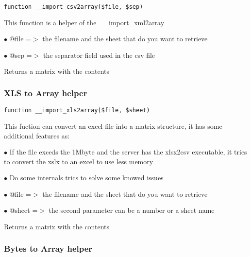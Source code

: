 \documentclass[a4paper]{article}
\begin{document}
\begin{lstlisting}
function __import_csv2array($file, $sep)
\end{lstlisting}

This function is a helper of the \_\_import\_xml2array

\begin{compactitem}
\item[\color{myblue}$\bullet$] @file =$>$ the filename and the sheet that do you want to retrieve
\item[\color{myblue}$\bullet$] @sep  =$>$ the separator field used in the csv file
\end{compactitem}

Returns a matrix with the contents

\hypertarget{toc468}{}
\subsubsection{XLS to Array helper}

\begin{lstlisting}
function __import_xls2array($file, $sheet)
\end{lstlisting}

This fuction can convert an excel file into a matrix structure, it has some additional features as:

\begin{compactitem}
\item[\color{myblue}$\bullet$] If the file exceds the 1Mbyte and the server has the xlsx2csv executable, it tries to convert the xslx
  to an excel to use less memory
\item[\color{myblue}$\bullet$] Do some internals trics to solve some knowed issues
\end{compactitem}

\begin{compactitem}
\item[\color{myblue}$\bullet$] @file  =$>$ the filename and the sheet that do you want to retrieve
\item[\color{myblue}$\bullet$] @sheet =$>$ the second parameter can be a number or a sheet name
\end{compactitem}

Returns a matrix with the contents

\hypertarget{toc469}{}
\subsubsection{Bytes to Array helper}
\end{document}
